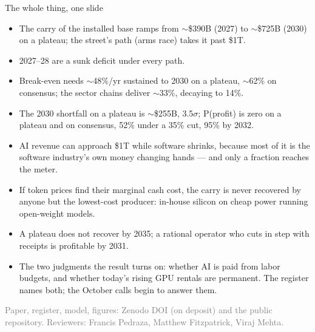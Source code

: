 \documentclass[aspectratio=169,11pt]{beamer}
\begin{document}
\begin{frame}[shrink=12]{The whole thing, one slide}
\footnotesize\begin{itemize}
\item The carry of the installed base ramps from $\sim$\$390B (2027) to $\sim$\$725B (2030) on a plateau; the street's path (arms race) takes it past \$1T.
\item 2027--28 are a sunk deficit under every path.
\item Break-even needs $\sim$48\%/yr sustained to 2030 on a plateau, $\sim$62\% on consensus; the sector chains deliver $\sim$33\%, decaying to 14\%.
\item The 2030 shortfall on a plateau is $\sim$\$255B, 3.5$\sigma$; P(profit) is zero on a plateau and on consensus, 52\% under a 35\% cut, 95\% by 2032.
\item AI revenue can approach \$1T while software shrinks, because most of it is the software industry's own money changing hands --- and only a fraction reaches the meter.
\item If token prices find their marginal cash cost, the carry is never recovered by anyone but the lowest-cost producer: in-house silicon on cheap power running open-weight models.
\item A plateau does not recover by 2035; a rational operator who cuts in step with receipts is profitable by 2031.
\item The two judgments the result turns on: whether AI is paid from labor budgets, and whether today's rising GPU rentals are permanent. The register names both; the October calls begin to answer them.
\end{itemize}
\vfill{\small\textcolor{gray}{Paper, register, model, figures: Zenodo DOI (on deposit) and the public repository. Reviewers: Francis Pedraza, Matthew Fitzpatrick, Viraj Mehta.}}
\end{frame}
\end{document}
